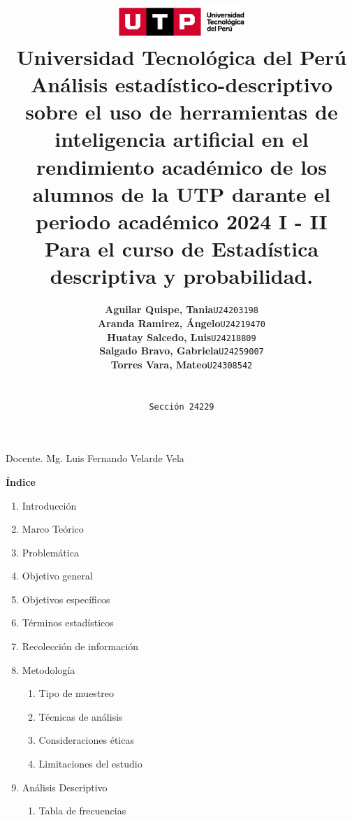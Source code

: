 \documentclass{article}
\title{
  \includegraphics[width=5cm]{./assets/logo-utp.png} \\
  \vspace{1cm}
  \textbf{Universidad Tecnológica del Perú} \\
  \vspace{2cm}
  \textbf{Análisis estadístico-descriptivo sobre el uso de herramientas de inteligencia artificial en el rendimiento académico de los alumnos de la UTP darante el periodo académico 2024 I - II} \\
  \vspace{1cm}
  \large \textbf{Para el curso de Estadística descriptiva y probabilidad.}
}
\author{
  \begin{tabular}{ll}
    \textbf{Aguilar Quispe, Tania} & \texttt{U24203198} \\
    \textbf{Aranda Ramirez, Ángelo} & \texttt{U24219470} \\
    \textbf{Huatay Salcedo, Luis} & \texttt{U24218809} \\
    \textbf{Salgado Bravo, Gabriela} & \texttt{U24259007} \\
    \textbf{Torres Vara, Mateo} & \texttt{U24308542} \\
  \end{tabular} \\\\
  \texttt{Sección 24229}
}
\newenvironment{indexPre}{}{}
\begin{document}
\maketitle

\begin{center}
  Docente. Mg. Luis Fernando Velarde Vela  
\end{center}

\restoregeometry

\setcounter{page}{2}   %

\newpage

\begin{indexPre}
  \begin{center}
    \textbf{\Large Índice}
\end{center}
\vspace{0.5cm} %

\begin{spacing}{1.15} %
  \noindent
  \renewcommand{\labelenumii}{\theenumi.\arabic{enumii}}
  \begin{enumerate}
    \item Introducción
    \item Marco Teórico
    \item Problemática
    \item Objetivo general
    \item Objetivos específicos
    \item Términos estadísticos
    \item Recolección de información
    \item Metodología
      \begin{enumerate}
        \item Tipo de muestreo
        \item Técnicas de análisis
        \item Consideraciones éticas
        \item Limitaciones del estudio
      \end{enumerate}
    \item Análisis Descriptivo
      \begin{enumerate}
        \item Tabla de frecuencias
      \end{enumerate}
  \end{enumerate}
\end{spacing}


\end{indexPre}
\end{document}
